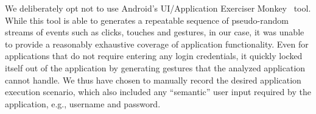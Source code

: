 We deliberately opt not to use Android's UI/Application Exerciser Monkey~\cite{monkey} tool. While this tool is able to  
generates a repeatable sequence of pseudo-random streams of events such as clicks, touches and gestures, in our case, 
it was unable to provide a reasonably exhaustive
coverage of application functionality. Even for applications that do not require entering any login credentials, it quickly locked itself out of the application by generating gestures that the analyzed application cannot handle. 
We thus have chosen to manually record the desired application execution scenario, which also included any ``semantic'' user input required by the application, e.g., username and password. 

\begin{figure}[!tp]
    \centering


\end{figure}
